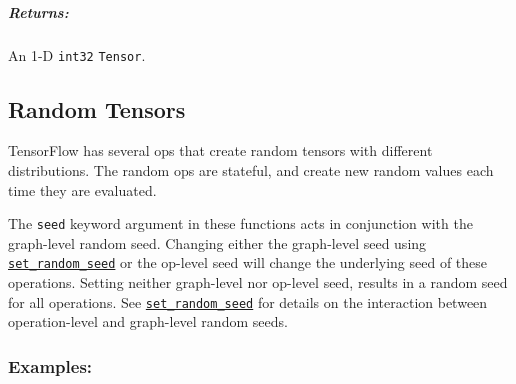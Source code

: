 \subparagraph{Returns: }\label{returns-7}

An 1-D \texttt{int32} \texttt{Tensor}.

\subsection{Random Tensors }\label{random-tensors}

TensorFlow has several ops that create random tensors with different
distributions. The random ops are stateful, and create new random values
each time they are evaluated.

The \texttt{seed} keyword argument in these functions acts in
conjunction with the graph-level random seed. Changing either the
graph-level seed using
\href{../../api_docs/python/constant_op.md\#set_random_seed}{\texttt{set\_random\_seed}}
or the op-level seed will change the underlying seed of these
operations. Setting neither graph-level nor op-level seed, results in a
random seed for all operations. See
\href{../../api_docs/python/constant_op.md\#set_random_seed}{\texttt{set\_random\_seed}}
for details on the interaction between operation-level and graph-level
random seeds.

\subsubsection{Examples: }\label{examples}

\begin{Shaded}
\begin{Highlighting}[]
\OperatorTok{=} \NormalTok{tf.random_normal([}\NormalTok{, }\NormalTok{], mean}\OperatorTok{=-}\OperatorTok{=}\NormalTok{)}

\OperatorTok{=} \NormalTok{tf.constant([[}\NormalTok{, }\NormalTok{], [}\NormalTok{, }\NormalTok{], [}\NormalTok{, }\NormalTok{]])}
\OperatorTok{=} 

\OperatorTok{=} 
 
 

\OperatorTok{=} \NormalTok{tf.constant([[}\NormalTok{, }\NormalTok{], [}\NormalTok{, }\NormalTok{], [}\NormalTok{, }\NormalTok{]])}
\OperatorTok{=} 
\OperatorTok{=} \OperatorTok{=}\NormalTok{)}
 
 
\end{Highlighting}
\end{Shaded}

